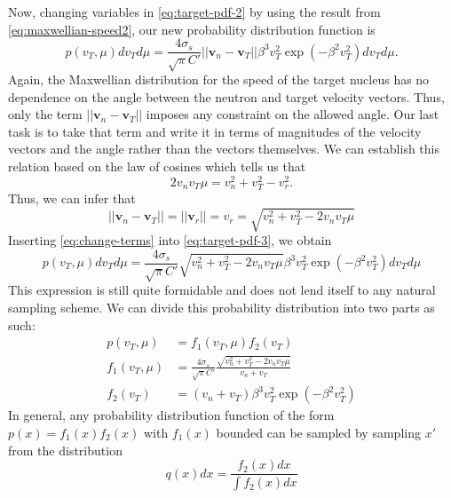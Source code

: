 Now, changing variables in \eqref{eq:target-pdf-2} by using the result from
\eqref{eq:maxwellian-speed2}, our new probability distribution function is
\begin{equation}
  \label{eq:target-pdf-3}
  p( v_T, \mu ) dv_T d\mu = \frac{4\sigma_s}{\sqrt{\pi}C'} || \mathbf{v}_n -
  \mathbf{v}_T || \beta^3 v_T^2 \exp \left ( -\beta^2 v_T^2 \right ) dv_T d\mu.
\end{equation}
Again, the Maxwellian distribution for the speed of the target nucleus has no
dependence on the angle between the neutron and target velocity vectors. Thus,
only the term $|| \mathbf{v}_n - \mathbf{v}_T ||$ imposes any constraint
on the allowed angle. Our last task is to take that term and write it in terms
of magnitudes of the velocity vectors and the angle rather than the vectors
themselves. We can establish this relation based on the law of cosines which
tells us that
\begin{equation}
  \label{eq:lawcosine}
  2 v_n v_T \mu = v_n^2 + v_T^2 - v_r^2.
\end{equation}
Thus, we can infer that
\begin{equation}
  \label{eq:change-terms}
  || \mathbf{v}_n - \mathbf{v}_T || = || \mathbf{v}_r || = v_r = \sqrt{v_n^2 +
    v_T^2 - 2v_n v_T \mu}
\end{equation}
Inserting \eqref{eq:change-terms} into \eqref{eq:target-pdf-3}, we obtain
\begin{equation}
  \label{eq:target-pdf-4}
  p( v_T, \mu ) dv_T d\mu = \frac{4\sigma_s}{\sqrt{\pi}C'} \sqrt{v_n^2 +
    v_T^2 - 2v_n v_T \mu} \beta^3 v_T^2 \exp \left ( -\beta^2 v_T^2 \right )
  dv_T d\mu
\end{equation}
This expression is still quite formidable and does not lend itself to any
natural sampling scheme. We can divide this probability distribution into two
parts as such:
\begin{align}
  \label{eq:divide-pdf-p}
  p(v_T, \mu) &= f_1(v_T, \mu) f_2(v_T) \\
  \label{eq:divide-pdf-f1}
  f_1(v_T, \mu) &= \frac{4\sigma_s}{\sqrt{\pi} C'} \frac{ \sqrt{v_n^2 + v_T^2 -
      2v_n v_T \mu}}{v_n + v_T} \\
  \label{eq:divide-pdf-f2}
  f_2(v_T) &= (v_n + v_T) \beta^3 v_T^2 \exp \left ( -\beta^2 v_T^2 \right )
\end{align}
In general, any probability distribution function of the form $p(x) =
f_1(x) f_2(x)$ with $f_1(x)$ bounded can be sampled by sampling
$x'$ from the distribution
\begin{equation}
  \label{eq:freegas-f2}
  q(x) dx = \frac{f_2(x) dx}{\int f_2(x) dx}
\end{equation}
